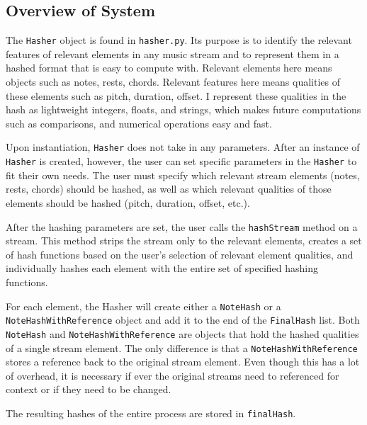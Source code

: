 \subsection{Overview of System}
The \texttt{Hasher} object is found in \texttt{hasher.py}. Its purpose is to identify the relevant features of relevant elements in any music stream and to represent them in a hashed format that is easy to compute with. Relevant elements here means objects such as notes, rests, chords. Relevant features here means qualities of these elements such as pitch, duration, offset. I represent these qualities in the hash as lightweight integers, floats, and strings, which makes future computations such as comparisons, and numerical operations easy and fast. 

Upon instantiation, \texttt{Hasher} does not take in any parameters. After an instance of \texttt{Hasher} is created, however, the user can set specific parameters in the \texttt{Hasher} to fit their own needs. The user must specify which relevant stream elements (notes, rests, chords) should be hashed, as well as which relevant qualities of those elements should be hashed (pitch, duration, offset, etc.). 

After the hashing parameters are set, the user calls the \texttt{hashStream} method on a stream. This method strips the stream only to the relevant elements, creates a set of hash functions based on the user's selection of relevant element qualities, and individually hashes each element with the entire set of specified hashing functions. 

For each element, the Hasher will create either a \texttt{NoteHash} or a \texttt{NoteHashWithReference} object and add it to the end of the \texttt{FinalHash} list. Both \texttt{NoteHash} and \texttt{NoteHashWithReference} are objects that hold the hashed qualities of a single stream element. The only difference is that a \texttt{NoteHashWithReference} stores a reference back to the original stream element. Even though this has a lot of overhead, it is necessary if ever the original streams need to referenced for context or if they need to be changed.

The resulting hashes of the entire process are stored in \texttt{finalHash}.

